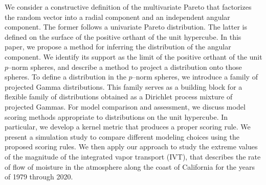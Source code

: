 
We consider a constructive definition of the multivariate Pareto that factorizes the 
random vector into a radial component and an independent angular component. The former
follows a univariate Pareto distribution. The latter is defined on the surface of the 
positive orthant of the unit  hypercube.  In this paper, we  propose a method for
inferring the distribution of the angular component.  We   identify its support 
as the limit of the positive orthant of the unit $p$--norm spheres, 
and describe a method to project a distribution onto those spheres. To define a 
distribution in the $p$--norm spheres, we introduce a family of projected Gamma 
distributions. This family serves as a building block for a flexible family of 
distributions obtained as  a Dirichlet process mixture of projected Gammas. For 
model comparison and assessment, we discuss model scoring methods appropriate 
to distributions on the unit hypercube.  In particular, we develop a kernel metric 
that produces a proper scoring rule.   We present a simulation study to compare 
different modeling choices using the proposed  scoring rules. We then apply our 
approach to study the extreme values of the  magnitude of the integrated vapor 
transport (IVT), that describes the rate of flow of moisture in the atmosphere 
along the coast of California for the years of 1979 through 2020.

